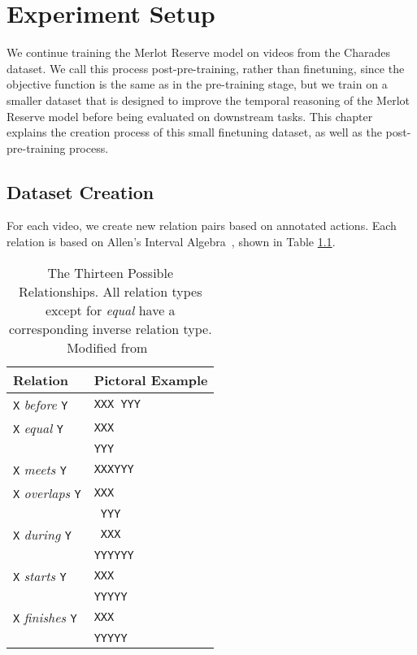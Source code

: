 \chapter{Experiment Setup}
\label{chap:setup}

We continue training the Merlot Reserve model on videos from the Charades
dataset. We call this process post-pre-training, rather than finetuning, since
the objective function is the same as in the pre-training stage, but we train
on a smaller dataset that is designed to improve the temporal reasoning of the
Merlot Reserve model before being evaluated on downstream tasks. This chapter
explains the creation process of this small finetuning dataset, as well as the
post-pre-training process.

\section{Dataset Creation}
\label{sec:data}


For each video, we create new relation pairs based on annotated actions. Each
relation is based on Allen's Interval Algebra~\citep{allen1983interval}, shown
in Table \ref{tab:allen_interval}. 

\begin{table}[tp]
	\centering
	\caption{The Thirteen Possible Relationships. All relation types except for
		\textit{equal} have a corresponding inverse relation type. Modified
		from~\citet{allen1983interval}}
	\label{tab:allen_interval}
	\begin{tabular}{ll}
	Relation & Pictoral Example \\
	\hline
	\texttt{X} \textit{before} \texttt{Y} & \texttt{XXX YYY} \\
	\texttt{X} \textit{equal} \texttt{Y} & \texttt{XXX} \\
					   & \texttt{YYY} \\
	\texttt{X} \textit{meets} \texttt{Y} & \texttt{XXXYYY} \\
	\texttt{X} \textit{overlaps} \texttt{Y} & \texttt{XXX} \\
						& \texttt{ YYY} \\
	\texttt{X} \textit{during} \texttt{Y} & \texttt{ XXX} \\
						& \texttt{YYYYYY} \\
	\texttt{X} \textit{starts} \texttt{Y} & \texttt{XXX} \\
						& \texttt{YYYYY} \\
	\texttt{X} \textit{finishes} \texttt{Y} & \texttt{\space\space XXX} \\
							& \texttt{YYYYY} \\
	\end{tabular}
\end{table}


